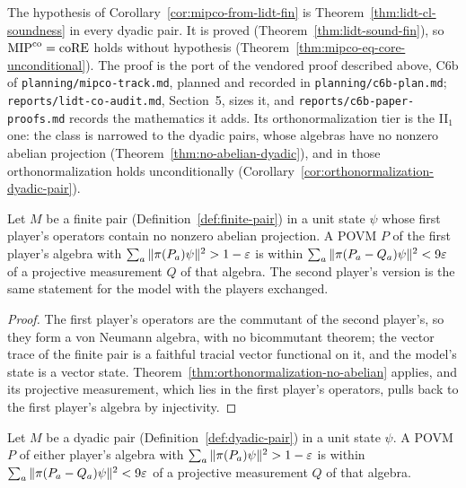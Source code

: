 The hypothesis of Corollary~\ref{cor:mipco-from-lidt-fin} is
Theorem~\ref{thm:lidt-cl-soundness} in every dyadic pair. It is proved
(Theorem~\ref{thm:lidt-sound-fin}), so $\mathrm{MIP}^{\mathrm{co}} = \mathrm{coRE}$ holds without hypothesis
(Theorem~\ref{thm:mipco-eq-core-unconditional}). The proof is the port of the vendored proof
described above, C6b of \texttt{planning/mipco-track.md}, planned and recorded in
\texttt{planning/c6b-plan.md}; \texttt{reports/lidt-co-audit.md}, Section~5, sizes it, and
\texttt{reports/c6b-paper-proofs.md} records the mathematics it adds. Its orthonormalization tier
is the II$_1$ one: the class is narrowed to the dyadic pairs, whose algebras have no nonzero
abelian projection (Theorem~\ref{thm:no-abelian-dyadic}), and in those orthonormalization holds
unconditionally (Corollary~\ref{cor:orthonormalization-dyadic-pair}).

\begin{corollary}
\label{cor:orthonormalization-finite-pair}
\leanok
Let $M$ be a finite pair (Definition~\ref{def:finite-pair}) in a unit state $\psi$ whose first
player's operators contain no nonzero abelian projection. A POVM $P$ of the first player's algebra
with $\sum_a \|\pi(P_a)\psi\|^2 > 1 - \varepsilon$ is within $\sum_a \|\pi(P_a - Q_a)\psi\|^2 < 9\varepsilon$ of a
projective measurement $Q$ of that algebra. The second player's version is the same statement for
the model with the players exchanged.
\end{corollary}

\begin{proof}
\leanok
The first player's operators are the commutant of the second player's, so they form a von Neumann
algebra, with no bicommutant theorem; the vector trace of the finite pair is a faithful tracial
vector functional on it, and the model's state is a vector state.
Theorem~\ref{thm:orthonormalization-no-abelian} applies, and its projective measurement, which lies
in the first player's operators, pulls back to the first player's algebra by injectivity.
\end{proof}

\begin{corollary}
\label{cor:orthonormalization-dyadic-pair}
\leanok
Let $M$ be a dyadic pair (Definition~\ref{def:dyadic-pair}) in a unit state $\psi$. A POVM $P$ of
either player's algebra with $\sum_a \|\pi(P_a)\psi\|^2 > 1 - \varepsilon$ is within $\sum_a \|\pi(P_a -
Q_a)\psi\|^2 < 9\varepsilon$ of a projective measurement $Q$ of that algebra.
\end{corollary}

